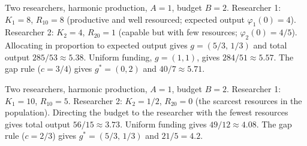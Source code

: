\begin{example}\label{ex:track-record}
Two researchers, harmonic production, $A = 1$, budget $B = 2$. Researcher 1: $K_1 = 8$, $R_{10} = 8$ (productive and well resourced; expected output $\varphi_1(0) = 4$). Researcher 2: $K_2 = 4$, $R_{20} = 1$ (capable but with few resources; $\varphi_2(0) = 4/5$). Allocating in proportion to expected output gives $g = (5/3,\, 1/3)$ and total output $285/53 \approx 5.38$. Uniform funding, $g = (1, 1)$, gives $284/51 \approx 5.57$. The gap rule ($c = 3/4$) gives $g^* = (0, 2)$ and $40/7 \approx 5.71$.
\end{example}

\begin{example}\label{ex:scarcity}
Two researchers, harmonic production, $A = 1$, budget $B = 2$. Researcher 1: $K_1 = 10$, $R_{10} = 5$. Researcher 2: $K_2 = 1/2$, $R_{20} = 0$ (the scarcest resources in the population). Directing the budget to the researcher with the fewest resources gives total output $56/15 \approx 3.73$. Uniform funding gives $49/12 \approx 4.08$. The gap rule ($c = 2/3$) gives $g^* = (5/3,\, 1/3)$ and $21/5 = 4.2$.
\end{example}


